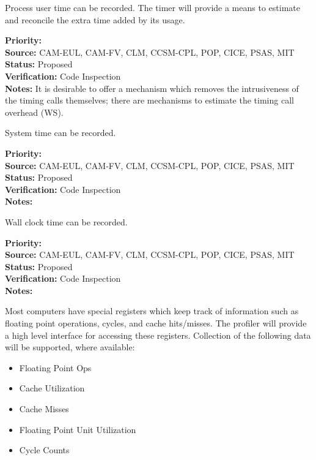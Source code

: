 
Process user time can be recorded.
The timer will provide a means to estimate and reconcile the extra time added by its usage.

\begin{reqlist}
{\bf Priority:}  \\
{\bf Source:} CAM-EUL, CAM-FV, CLM, CCSM-CPL, POP, CICE, PSAS, MIT \\
{\bf Status:} Proposed \\
{\bf Verification:} Code Inspection \\
{\bf Notes:} It is desirable to offer a mechanism which removes the
  intrusiveness of the timing calls themselves; there are mechanisms
  to estimate the timing call overhead (WS).
  
\end{reqlist}


System time can be recorded.

\begin{reqlist}
{\bf Priority:}  \\
{\bf Source:} CAM-EUL, CAM-FV, CLM, CCSM-CPL, POP, CICE, PSAS, MIT \\
{\bf Status:} Proposed \\
{\bf Verification:} Code Inspection \\
{\bf Notes:} 
\end{reqlist}



Wall clock time can be recorded.

\begin{reqlist}
{\bf Priority:}  \\
{\bf Source:} CAM-EUL, CAM-FV, CLM, CCSM-CPL, POP, CICE, PSAS, MIT \\
{\bf Status:} Proposed \\
{\bf Verification:} Code Inspection \\
{\bf Notes:} 
\end{reqlist}



Most computers have special registers which keep track of information such
as floating point operations, cycles, and cache hits/misses.  The profiler will
provide a high level interface for accessing these registers.
Collection of the following data will be supported, where available:
\begin{itemize}
\item{Floating Point Ops}
\item{Cache Utilization}
\item{Cache Misses}
\item{Floating Point Unit Utilization}
\item{Cycle Counts}
\end{itemize}

